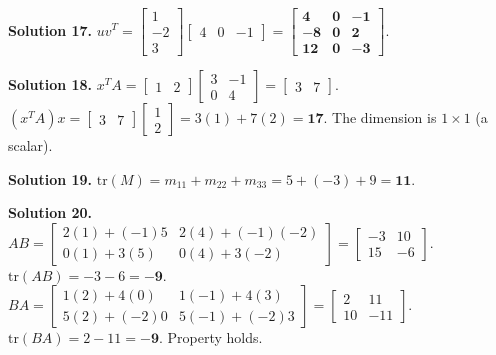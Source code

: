 \documentclass[11pt]{article}
\begin{document}
\vspace{0.2cm}\noindent\textbf{Solution 17.}
$uv^T = \begin{bmatrix} 1 \\ -2 \\ 3 \end{bmatrix} \begin{bmatrix} 4 & 0 & -1 \end{bmatrix} = \mathbf{\begin{bmatrix} 4 & 0 & -1 \\ -8 & 0 & 2 \\ 12 & 0 & -3 \end{bmatrix}}$.

\vspace{0.2cm}\noindent\textbf{Solution 18.}
$x^T A = \begin{bmatrix} 1 & 2 \end{bmatrix} \begin{bmatrix} 3 & -1 \\ 0 & 4 \end{bmatrix} = \begin{bmatrix} 3 & 7 \end{bmatrix}$.\\
$(x^T A) x = \begin{bmatrix} 3 & 7 \end{bmatrix} \begin{bmatrix} 1 \\ 2 \end{bmatrix} = 3(1) + 7(2) = \mathbf{17}$. The dimension is $1 \times 1$ (a scalar).

\vspace{0.2cm}\noindent\textbf{Solution 19.}
$\text{tr}(M) = m_{11} + m_{22} + m_{33} = 5 + (-3) + 9 = \mathbf{11}$.

\vspace{0.2cm}\noindent\textbf{Solution 20.}
$AB = \begin{bmatrix} 2(1)+(-1)5 & 2(4)+(-1)(-2) \\ 0(1)+3(5) & 0(4)+3(-2) \end{bmatrix} = \begin{bmatrix} -3 & 10 \\ 15 & -6 \end{bmatrix}$. $\text{tr}(AB) = -3 - 6 = \mathbf{-9}$.\\
$BA = \begin{bmatrix} 1(2)+4(0) & 1(-1)+4(3) \\ 5(2)+(-2)0 & 5(-1)+(-2)3 \end{bmatrix} = \begin{bmatrix} 2 & 11 \\ 10 & -11 \end{bmatrix}$. $\text{tr}(BA) = 2 - 11 = \mathbf{-9}$. Property holds.
\end{document}
